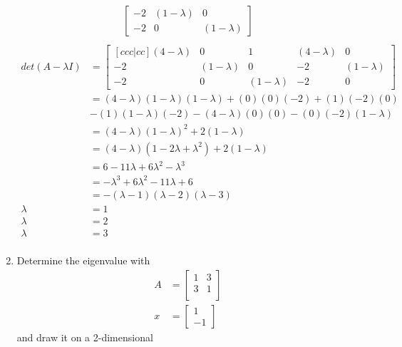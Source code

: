 \documentclass[12pt,titlepage]{article}
\begin{document}
\begin{enumerate}
{\begin{align*}
\begin{bmatrix}
                -2 & (1 - \lambda) & 0 \\
                -2 & 0 & (1 - \lambda)
            \end{bmatrix} \\
        \end{align*}
        \begin{align*}
            det(A - \lambda I) &= \begin{bmatrix}[ccc|cc]
                (4 - \lambda) & 0 & 1 & (4 - \lambda) & 0 \\
                -2 & (1 - \lambda) & 0 & -2 & (1 - \lambda) \\
                -2 & 0 & (1 - \lambda) & -2 & 0
            \end{bmatrix} \\
            &= (4 - \lambda)(1 - \lambda)(1 - \lambda) + (0)(0)(-2) + (1)(-2)(0) \\
            &- (1)(1-\lambda)(-2) - (4-\lambda)(0)(0) - (0)(-2)(1-\lambda) \\
            &= (4 - \lambda)(1 - \lambda)^2 + 2(1 - \lambda) \\
            &= (4 - \lambda)(1 - 2\lambda + \lambda^2) + 2(1 - \lambda) \\
            &= 6 - 11 \lambda + 6 \lambda^2 - \lambda^3 \\
            &= -\lambda^3 + 6 \lambda^2 - 11 \lambda + 6 \\
            &= -(\lambda - 1)(\lambda - 2)(\lambda - 3) \\
        \lambda &= 1 \\
        \lambda &= 2 \\
        \lambda &= 3 \\
        \end{align*}
    }
    \pagebreak
    \item {
        Determine the eigenvalue with
        \begin{align*}
            A &= \begin{bmatrix}
                1 & 3 \\
                3 & 1\\
            \end{bmatrix}
            \\
            x &= \begin{bmatrix}
                1 \\
                -1
            \end{bmatrix}
        \end{align*}
        and draw it on a 2-dimensional

}
\end{enumerate}
\end{document}

